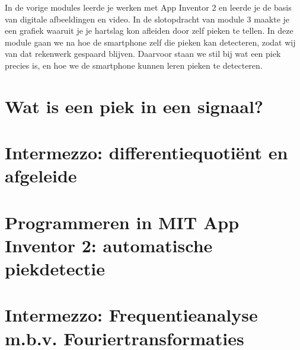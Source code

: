 \label{sec:piekdetectie}

\begin{samenvatting}
	In de vorige modules leerde je werken met App Inventor 2 en leerde je de basis van digitale afbeeldingen en video. In de slotopdracht van module 3 maakte je een grafiek waaruit je je hartslag kon afleiden door zelf pieken te tellen. In deze module gaan we na hoe de smartphone zelf die pieken kan detecteren, zodat wij van dat rekenwerk gespaard blijven. Daarvoor staan we stil bij wat een piek precies is, en hoe we de smartphone kunnen leren pieken te detecteren. 
\end{samenvatting}
%

\section{Wat is een piek in een signaal?}
\label{sec:Mod4_Sec1}
%

\section{Intermezzo: differentiequoti\"ent en afgeleide}
\label{sec:Mod4_Sec2}
%


\section{Programmeren in MIT App Inventor 2: automatische piekdetectie}
\label{sec:Mod4_Sec3}
%

\section{Intermezzo: Frequentieanalyse m.b.v. Fouriertransformaties}
\label{sec:Mod4_Sec4}
%
